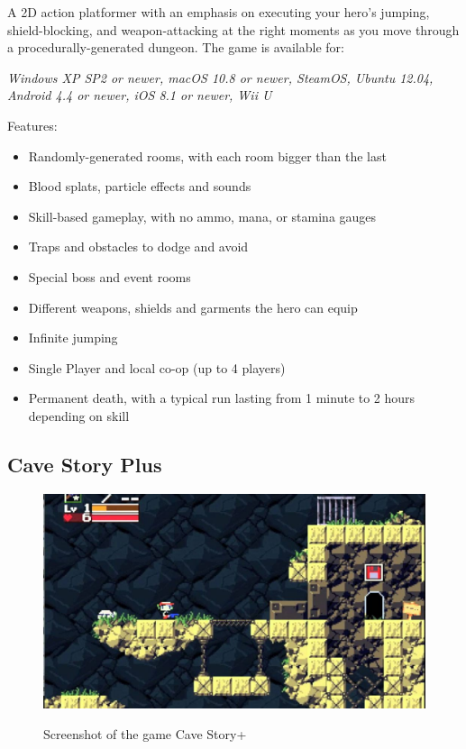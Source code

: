 \documentclass[12p]{article}
\begin{document}
A 2D action platformer with an emphasis on executing your hero's jumping, shield-blocking, and weapon-attacking at the right moments as you move through a procedurally-generated dungeon. The game is available for:

\emph{Windows XP SP2 or newer, macOS 10.8 or newer, SteamOS, Ubuntu 12.04, Android 4.4 or newer, iOS 8.1 or newer, Wii U}

Features:

\begin{itemize}
    \item Randomly-generated rooms, with each room bigger than the last
    \item Blood splats, particle effects and sounds
    \item Skill-based gameplay, with no ammo, mana, or stamina gauges
    \item Traps and obstacles to dodge and avoid
    \item Special boss and event rooms
    \item Different weapons, shields and garments the hero can equip
    \item Infinite jumping
    \item Single Player and local co-op (up to 4 players)
    \item Permanent death, with a typical run lasting from 1 minute to 2 hours depending on skill
\end{itemize}


\subsection{Cave Story Plus}

\begin{figure}[h]
    \center
    \includegraphics[width=1\textwidth]{StateOfTheArtScreenshots/cave_story_plus}
    \label{StateOfTheArt_Screenshots_CaveStoryPlus}
    \caption{Screenshot of the game Cave Story+ \cite{CaveStoryPlusScreenshot}}
\end{figure}
\end{document}
